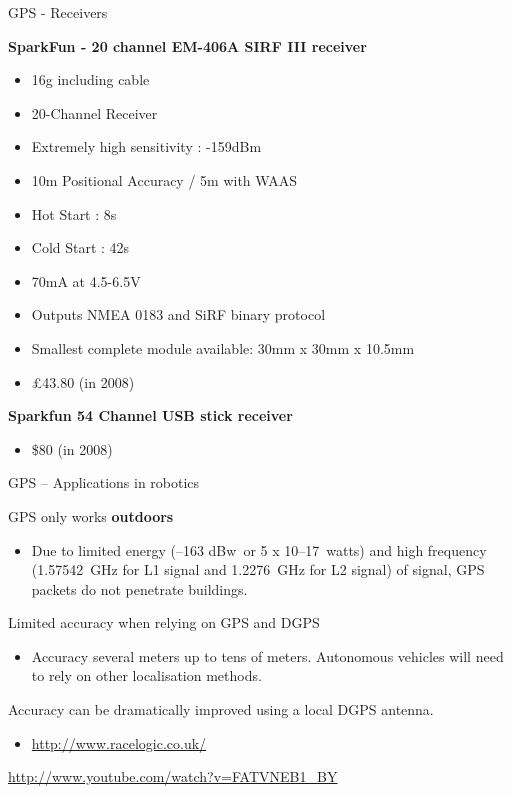 \documentclass[compress]{beamer}
\begin{document}
\begin{frame}{GPS - Receivers}

\textbf{SparkFun - 20 channel EM-406A SIRF III receiver}

\begin{itemize}

\item
  16g including cable
\item
  20-Channel Receiver
\item
  Extremely high sensitivity : -159dBm
\item
  10m Positional Accuracy / 5m with WAAS
\item
  Hot Start : 8s
\item
  Cold Start : 42s
\item
  70mA at 4.5-6.5V
\item
  Outputs NMEA 0183 and SiRF binary protocol
\item
  Smallest complete module available: 30mm x 30mm x 10.5mm
\item
  £43.80 (in 2008)
\end{itemize}

\textbf{Sparkfun 54 Channel USB stick receiver}

\begin{itemize}

\item
  \$80 (in 2008)
\end{itemize}

\end{frame}

\begin{frame}{GPS -- Applications in robotics}

GPS only works \textbf{outdoors}

\begin{itemize}

\item
  Due to limited energy (--163 dBw~or 5 x 10--17~watts) and high
  frequency (1.57542~GHz for L1 signal and 1.2276~GHz for L2 signal) of
  signal, GPS packets do not penetrate buildings.
\end{itemize}

Limited accuracy when relying on GPS and DGPS

\begin{itemize}

\item
  Accuracy several meters up to tens of meters. Autonomous vehicles will
  need to rely on other localisation methods.
\end{itemize}

Accuracy can be dramatically improved using a local DGPS antenna.

\begin{itemize}

\item
  \url{http://www.racelogic.co.uk/}
\end{itemize}

\url{http://www.youtube.com/watch?v=FATVNEB1_BY}

\end{frame}
\end{document}
